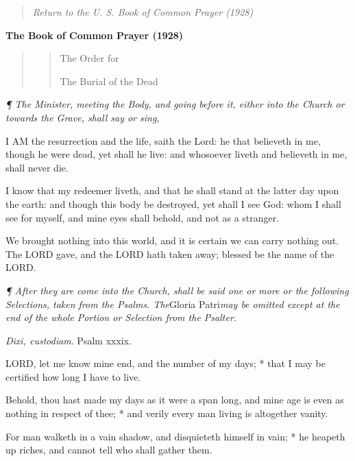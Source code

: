 \begin{quote}

\emph{Return to the U.
S. Book of Common Prayer (1928)}

\end{quote}


\textbf{The Book of Common Prayer (1928)}

\begin{quote}

\begin{quote}

The Order
for 

The
Burial of the Dead

\end{quote}

\end{quote}

\emph{¶
The Minister, meeting the Body, and going before it, either into the Church
or towards the Grave, shall say or sing,}

I
AM the resurrection and the life, saith the Lord: he that believeth in
me, though he were dead, yet shall he live: and whosoever liveth and believeth
in me, shall never die.

I
know that my redeemer liveth, and that he shall stand at the latter day
upon the earth: and though this body be destroyed, yet shall I see God:
whom I shall see for myself, and mine eyes shall behold, and not as a
stranger.

We
brought nothing into this world, and it is certain we can carry nothing
out. The LORD gave, and the LORD
hath taken away; blessed be the name of the LORD.

\emph{¶ After they are come into the Church, shall be said one or more
or the following Selections, taken from the Psalms. The}Gloria Patri\emph{may be omitted except at the end of the whole Portion or Selection from
the Psalter.}

\emph{Dixi,
custodiam}. Psalm xxxix.

LORD,
let me know mine end, and the number of my days; * that I may be certified
how long I have to live.

Behold, thou hast made my days as it were a span long,
and mine age is even as nothing in respect of thee; * and verily every
man living is altogether vanity.

For man walketh in a vain shadow, and disquieteth himself
in vain; * he heapeth up riches, and cannot tell who shall gather them.

